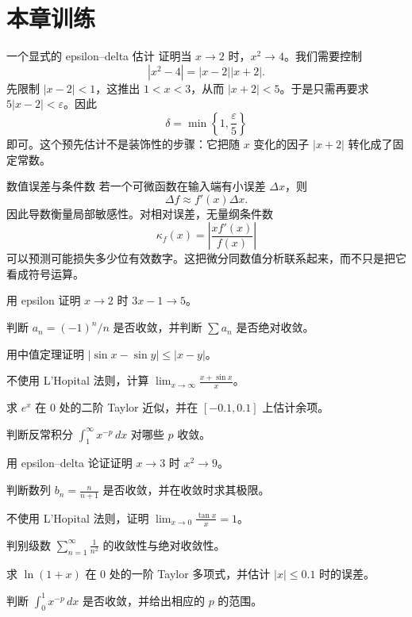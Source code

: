 \section{本章训练}

\begin{workedexample}{一个显式的 epsilon--delta 估计}
证明当 $x\to2$ 时，$x^2\to4$。我们需要控制
\[
    |x^2-4|=|x-2||x+2|.
\]
先限制 $|x-2|<1$，这推出 $1<x<3$，从而 $|x+2|<5$。于是只需再要求 $5|x-2|<\varepsilon$。因此
\[
    \delta=\min\left\{1,\frac{\varepsilon}{5}\right\}
\]
即可。这个预先估计不是装饰性的步骤：它把随 $x$ 变化的因子 $|x+2|$ 转化成了固定常数。
\end{workedexample}

\begin{applicationbox}{数值误差与条件数}
若一个可微函数在输入端有小误差 $\Delta x$，则
\[
    \Delta f\approx f'(x)\Delta x.
\]
因此导数衡量局部敏感性。对相对误差，无量纲条件数
\[
    \kappa_f(x)=\left|\frac{x f'(x)}{f(x)}\right|
\]
可以预测可能损失多少位有效数字。这把微分同数值分析联系起来，而不只是把它看成符号运算。
\end{applicationbox}

\begin{chapterexercises}
    \item 用 epsilon 证明 $x\to2$ 时 $3x-1\to5$。
    \item 判断 $a_n=(-1)^n/n$ 是否收敛，并判断 $\sum a_n$ 是否绝对收敛。
    \item 用中值定理证明 $|\sin x-\sin y|\le|x-y|$。
    \item 不使用 L'Hopital 法则，计算 $\displaystyle\lim_{x\to\infty}\frac{x+\sin x}{x}$。
    \item 求 $e^x$ 在 $0$ 处的二阶 Taylor 近似，并在 $[-0.1,0.1]$ 上估计余项。
    \item 判断反常积分 $\displaystyle\int_1^\infty x^{-p}\,dx$ 对哪些 $p$ 收敛。
    \item 用 epsilon--delta 论证证明 $x\to3$ 时 $x^2\to9$。
    \item 判断数列 $b_n=\frac{n}{n+1}$ 是否收敛，并在收敛时求其极限。
    \item 不使用 L'Hopital 法则，证明 $\displaystyle\lim_{x\to0}\frac{\tan x}{x}=1$。
    \item 判别级数 $\displaystyle\sum_{n=1}^\infty \frac{1}{n^2}$ 的收敛性与绝对收敛性。
    \item 求 $\ln(1+x)$ 在 $0$ 处的一阶 Taylor 多项式，并估计 $|x|\le0.1$ 时的误差。
    \item 判断 $\displaystyle\int_0^1 x^{-p}\,dx$ 是否收敛，并给出相应的 $p$ 的范围。
\end{chapterexercises}

